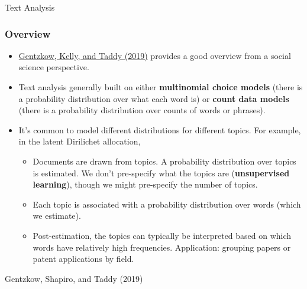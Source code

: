 \documentclass[aspectratio=169,11pt]{beamer}
\begin{document}
\begin{frame}
\begin{center}
Text Analysis
\end{center}
\end{frame}


\begin{frame}
\frametitle{Overview}
\begin{itemize}
\item \href{https://web.stanford.edu/~gentzkow/research/text-as-data.pdf}{Gentzkow, Kelly, and Taddy (2019)} provides
	a good overview from a social science perspective. 

	\item Text analysis generally built on either {\bf multinomial choice models} (there is a probability distribution over what each word is) or 
		{\bf count data models} (there is a probability distribution over counts of words or phrases). 

	\item It's common to model different distributions for different topics. For example, in the latent Dirilichet allocation,
 	\begin{itemize}
		\item Documents are drawn from topics. A probability distribution over topics is estimated. We don't pre-specify what the topics are 
			({\bf unsupervised learning}), though we might pre-specify the number of topics.

		\item Each topic is associated with a probability distribution over words (which we estimate). 

		\item Post-estimation, the topics can typically be interpreted based on which words have relatively high frequencies. Application: grouping papers or
			patent applications by field. 

	\end{itemize}
\end{itemize}
\end{frame}




\begin{frame}
\begin{center}
Gentzkow, Shapiro, and Taddy (2019) 
\end{center}
\end{frame}
\end{document}
